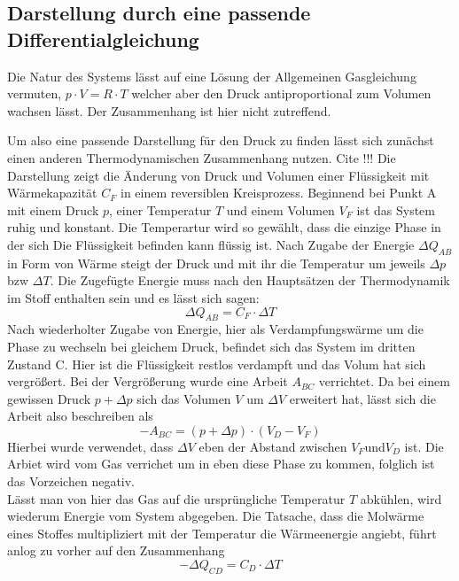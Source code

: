 \subsection{Darstellung durch eine passende Differentialgleichung}
Die Natur des Systems lässt auf eine Lösung der Allgemeinen Gasgleichung vermuten,
$p \cdot V = R \cdot T$
welcher aber den Druck antiproportional zum Volumen wachsen lässt. Der Zusammenhang ist hier nicht zutreffend.

Um also eine passende Darstellung für den Druck zu finden lässt sich zunächst einen anderen Thermodynamischen Zusammenhang nutzen. 
Cite !!! Die Darstellung zeigt die Änderung von Druck und Volumen einer Flüssigkeit mit Wärmekapazität $C_F$ in einem reversiblen Kreisprozess.
Beginnend bei Punkt A mit einem Druck $p$, einer Temperatur $T$ und einem Volumen $V_F$ ist das System ruhig und konstant. Die Temperartur wird so
gewählt, dass die einzige Phase in der sich Die Flüssigkeit befinden kann flüssig ist.
Nach Zugabe der Energie $\Delta Q_{AB}$ in Form von Wärme steigt der Druck und mit ihr die Temperatur um jeweils $\Delta p$ bzw $\Delta T$.
Die Zugefügte Energie muss nach den Hauptsätzen der Thermodynamik im Stoff enthalten sein und es lässt sich sagen:
\begin{equation}
    \Delta Q_{AB} = C_F \cdot \Delta T
\end{equation}
Nach wiederholter Zugabe von Energie, hier als Verdampfungswärme um die Phase zu wechseln bei gleichem Druck, befindet sich das System im dritten Zustand
C. Hier ist die Flüssigkeit restlos verdampft und das Volum hat sich vergrößert. Bei der Vergrößerung wurde eine Arbeit $A_{BC}$ verrichtet. 
Da bei einem gewissen Druck $p +\Delta p$ sich das Volumen $V$  um $\Delta V$ erweitert hat, lässt sich die Arbeit also beschreiben als
\begin{equation}
\label{eqn:BC}
    -A_{BC} = (p+ \Delta p) \cdot (V_D-V_F)
\end{equation}
Hierbei wurde verwendet, dass $\Delta V$ eben der Abstand zwischen $V_F \text{und} V_D$ ist. Die Arbiet wird vom Gas verrichet um in eben diese Phase
zu kommen, folglich ist das Vorzeichen negativ. \\
Lässt man von hier das Gas auf die ursprüngliche Temperatur $T$ abkühlen, wird wiederum Energie vom System abgegeben.
Die Tatsache, dass die Molwärme eines Stoffes multipliziert mit der Temperatur die Wärmeenergie angiebt, führt anlog zu vorher auf den Zusammenhang
\begin{equation}
    -\Delta Q_{CD} = C_D \cdot \Delta T
\end{equation}
